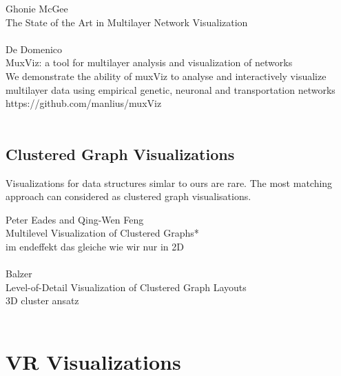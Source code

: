 

Ghonie McGee\\
The State of the Art in Multilayer Network Visualization\\
\\
De Domenico\\
MuxViz: a tool for multilayer analysis and visualization of networks\\
We demonstrate the ability of muxViz to analyse and interactively visualize multilayer data using empirical genetic, neuronal and transportation networks https://github.com/manlius/muxViz\\
\\

\subsection{Clustered Graph Visualizations}
Visualizations for data structures simlar to ours are rare. The most matching approach can considered as clustered graph visualisations.

Peter Eades and Qing-Wen Feng\\
Multilevel Visualization of Clustered Graphs*\\
im endeffekt das gleiche wie wir nur in 2D\\
\\
Balzer\\
Level-of-Detail Visualization of Clustered Graph Layouts\\
3D cluster ansatz\\
\\


\section{VR Visualizations}

